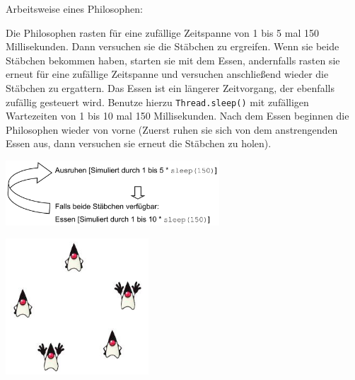 Arbeitsweise eines Philosophen:

Die Philosophen rasten für eine zufällige Zeitspanne von 1 bis 5 mal 150
Millisekunden. Dann versuchen sie die Stäbchen zu ergreifen. Wenn sie beide
Stäbchen bekommen haben, starten sie mit dem Essen, andernfalls rasten sie
erneut für eine zufällige Zeitspanne und versuchen anschließend wieder die
Stäbchen zu ergattern. Das Essen ist ein längerer Zeitvorgang, der ebenfalls
zufällig gesteuert wird. Benutze hierzu \lstinline|Thread.sleep()| mit
zufälligen Wartezeiten von 1 bis 10 mal 150 Millisekunden. Nach dem Essen beginnen die
Philosophen wieder von vorne (Zuerst ruhen sie sich von dem anstrengenden Essen
aus, dann versuchen sie erneut die Stäbchen zu holen).

\begin{center}
\includegraphics[width=0.6\textwidth]{./inf/SEKII/26_Java_Threads/Dining_Philosophers-Workflow.png}
\end{center}

\begin{center}
\includegraphics[width=0.4\textwidth]{./inf/SEKII/26_Java_Threads/Dining_Philosophers_Java.png}
\end{center}
